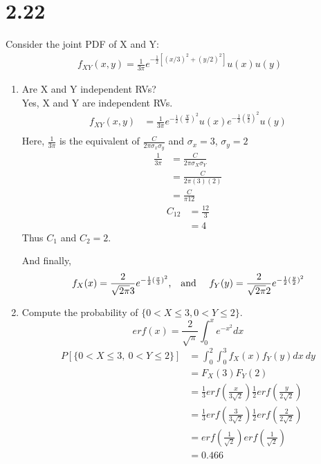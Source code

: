 \documentclass[12pt]{article}
\newcommand{\mysection}[1]{\section*{#1}}
\begin{document}
\mysection{2.22}
Consider the joint PDF of X and Y:\\
\begin{align*}
f_{XY}(x,y)=\frac{1}{3\pi}e^{-\frac{1}{2}[{(x/3)}^2+{(y/2)}^2]}u(x)u(y)
\end{align*}
\begin{enumerate}
  \item Are X and Y independent RVs?  \\
    Yes, X and Y are independent RVs.
    \begin{align*}
      f_{XY}(x,y)&=\frac{1}{3\pi}e^{-\frac{1}{2}{(\frac{X}{3})}^2}u(x)
                                 e^{-\frac{1}{2}{(\frac{y}{2})}^2}u(y)\\
    \end{align*}
  Here, $\frac{1}{3\pi}$ is the equivalent of $\frac{C}{2\pi \sigma_x \sigma_y}$ and $\sigma_x = 3$, $\sigma_y = 2$
  \begin{align*}
    \frac{1}{3\pi}&=\frac{C}{2\pi\sigma_X\sigma_Y}\\
                  &=\frac{C}{2\pi(3)(2)}\\
                  &=\frac{C}{\pi12}
  \end{align*}
  \begin{align*}
    C_{12}&=\frac{12}{3}\\
          &=4
  \end{align*}
  Thus $C_1$ and $C_2 = 2$.

  And finally, 
  \[ f_X(x)=\frac{2}{\sqrt{2\pi}3}e^{-{\frac{1}{2}(\frac{x}{3})}^2} \text{,\quad and \quad} 
     f_Y(y)=\frac{2}{\sqrt{2\pi}2}e^{-{\frac{1}{2}(\frac{y}{2})}^2} \]

  \item Compute the probability of $\{0<X\leq3, 0<Y\leq2\}$.
    \[ erf(x)=\frac{2}{\sqrt\pi}\int_0^x e^{-x^2}dx \]
    \begin{align*}
      P[\{0<X\leq3,\ 0<Y\leq2\}]&=\int_0^2\int_0^3 f_X(x)f_Y(y) dx\ dy\\
                               &=F_X(3)F_Y(2)\\
                               &=\frac{1}{3}erf(\frac{x}{3\sqrt2})\frac{1}{2}erf(\frac{y}{2\sqrt2})\\
                               &=\frac{1}{3}erf(\frac{3}{3\sqrt2})\frac{1}{2}erf(\frac{2}{2\sqrt2})\\
                               &=erf(\frac{1}{\sqrt2})erf(\frac{1}{\sqrt2})\\
                               &=0.466
    \end{align*}
\end{enumerate}
\newpage 
\end{document}
